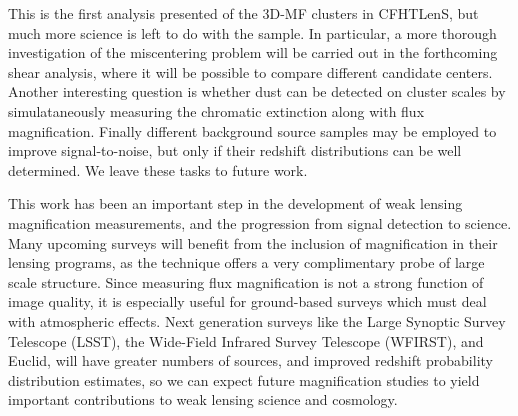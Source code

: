 This is the first analysis presented of the 3D-MF clusters in CFHTLenS, but much more science is left to do with the sample. In particular, a more thorough investigation of the miscentering problem will be carried out in the forthcoming shear analysis, where it will be possible to compare different candidate centers. Another interesting question is whether dust can be detected on cluster scales by simulataneously measuring the chromatic extinction along with flux magnification. Finally different background source samples may be employed to improve signal-to-noise, but only if their redshift distributions can be well determined. We leave these tasks to future work.

This work has been an important step in the development of weak lensing magnification measurements, and the progression from signal detection to science. Many upcoming surveys will benefit from the inclusion of magnification in their lensing programs, as the technique offers a very complimentary probe of large scale structure. Since measuring flux magnification is not a strong function of image quality, it is especially useful for ground-based surveys which must deal with atmospheric effects. Next generation surveys like the Large Synoptic Survey Telescope (LSST), the Wide-Field Infrared Survey Telescope (WFIRST), and Euclid, will have greater numbers of sources, and improved redshift probability distribution estimates, so we can expect future magnification studies to yield important contributions to weak lensing science and cosmology.



